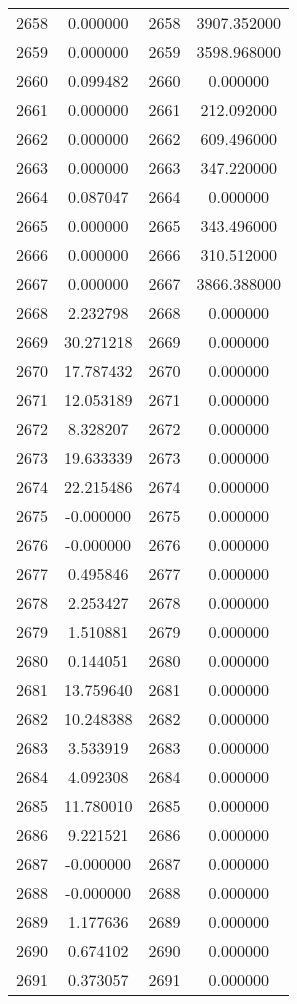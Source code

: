 \documentclass[12pt]{article}
\begin{document}
\begin{longtable}{@{}cccc@{}}
2658 & 0.000000 & 2658 & 3907.352000 \\
2659 & 0.000000 & 2659 & 3598.968000 \\
2660 & 0.099482 & 2660 & 0.000000 \\
2661 & 0.000000 & 2661 & 212.092000 \\
2662 & 0.000000 & 2662 & 609.496000 \\
2663 & 0.000000 & 2663 & 347.220000 \\
2664 & 0.087047 & 2664 & 0.000000 \\
2665 & 0.000000 & 2665 & 343.496000 \\
2666 & 0.000000 & 2666 & 310.512000 \\
2667 & 0.000000 & 2667 & 3866.388000 \\
2668 & 2.232798 & 2668 & 0.000000 \\
2669 & 30.271218 & 2669 & 0.000000 \\
2670 & 17.787432 & 2670 & 0.000000 \\
2671 & 12.053189 & 2671 & 0.000000 \\
2672 & 8.328207 & 2672 & 0.000000 \\
2673 & 19.633339 & 2673 & 0.000000 \\
2674 & 22.215486 & 2674 & 0.000000 \\
2675 & -0.000000 & 2675 & 0.000000 \\
2676 & -0.000000 & 2676 & 0.000000 \\
2677 & 0.495846 & 2677 & 0.000000 \\
2678 & 2.253427 & 2678 & 0.000000 \\
2679 & 1.510881 & 2679 & 0.000000 \\
2680 & 0.144051 & 2680 & 0.000000 \\
2681 & 13.759640 & 2681 & 0.000000 \\
2682 & 10.248388 & 2682 & 0.000000 \\
2683 & 3.533919 & 2683 & 0.000000 \\
2684 & 4.092308 & 2684 & 0.000000 \\
2685 & 11.780010 & 2685 & 0.000000 \\
2686 & 9.221521 & 2686 & 0.000000 \\
2687 & -0.000000 & 2687 & 0.000000 \\
2688 & -0.000000 & 2688 & 0.000000 \\
2689 & 1.177636 & 2689 & 0.000000 \\
2690 & 0.674102 & 2690 & 0.000000 \\
2691 & 0.373057 & 2691 & 0.000000 \\

\end{longtable}
\end{document}
